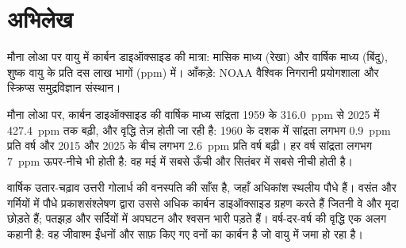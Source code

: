 \section{अभिलेख}

\begin{omfigure}

{\small मौना लोआ पर वायु में कार्बन डाइऑक्साइड की मात्रा: मासिक माध्य
(रेखा) और वार्षिक माध्य (बिंदु), शुष्क वायु के प्रति दस लाख भागों (ppm) में।
आँकड़े: NOAA वैश्विक निगरानी प्रयोगशाला और स्क्रिप्स समुद्रविज्ञान
संस्थान।}
\end{omfigure}

\begin{proposition}[कार्बन डाइऑक्साइड का अभिलेख]\label{prop:g12:climate-change:co2}
मौना लोआ पर, कार्बन डाइऑक्साइड की वार्षिक माध्य सांद्रता 1959 के
\qty{316.0}{ppm} से 2025 में \qty{427.4}{ppm} तक बढ़ी, और वृद्धि
तेज़ होती जा रही है: 1960 के दशक में सांद्रता लगभग \qty{0.9}{ppm} प्रति वर्ष
और 2015 और 2025 के बीच लगभग \qty{2.6}{ppm} प्रति वर्ष बढ़ी। हर
वर्ष सांद्रता लगभग \qty{7}{ppm} ऊपर-नीचे भी होती है: वह मई में सबसे ऊँची
और सितंबर में सबसे नीची होती है।
\end{proposition}

\begin{remark}[वक्र के दाँते क्यों हैं]\label{rem:g12:climate-change:teeth}
वार्षिक उतार-चढ़ाव उत्तरी गोलार्ध की वनस्पति की साँस है,
जहाँ अधिकांश स्थलीय पौधे हैं। वसंत और गर्मियों में पौधे
प्रकाशसंश्लेषण द्वारा उससे अधिक कार्बन डाइऑक्साइड ग्रहण करते हैं जितनी वे और मृदा छोड़ते हैं;
पतझड़ और सर्दियों में अपघटन और श्वसन भारी पड़ते हैं। वर्ष-दर-वर्ष की
वृद्धि एक अलग कहानी है: वह जीवाश्म ईंधनों और साफ़ किए गए
वनों का कार्बन है जो वायु में जमा हो रहा है।
\end{remark}

